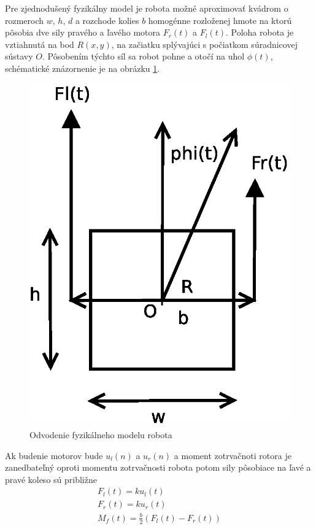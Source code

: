 Pre zjednodušený fyzikálny model je robota možné aproximovať kvádrom o rozmeroch $w$, $h$, $d$ a rozchode
kolies $b$ homogénne rozloženej hmote na ktorú pôsobia dve sily pravého a ľavého motora $F_r(t)$ a $F_l(t)$.
Poloha robota je vztiahnutá na bod $R(x, y)$, na začiatku splývajúci s počiatkom súradnicovej sústavy
$O$. Pôsobením týchto síl sa robot pohne a otočí na uhol $\phi(t)$, schématické znázornenie je na
obrázku \ref{img:motoko_model}.

\begin{figure}[!htb]
\center
\includegraphics[scale=.5]{../diagrams/robot_model.eps}
\caption{Odvodenie fyzikálneho modelu robota}
\label{img:motoko_model}
\end{figure}

Ak budenie motorov bude $u_l(n)$ a $u_r(n)$ a moment zotrvačnoti rotora
je zanedbateľný oproti momentu zotrvačnosti robota potom sily pôsobiace na ľavé a pravé koleso sú približne
\begin{align}
  F_l(t) = ku_l(t) \\
  F_r(t) = ku_r(t) \\
  M_f(t) = \frac{b}{2}(F_l(t) - F_r(t))
\end{align}

